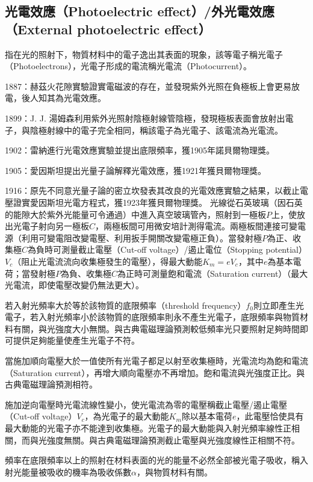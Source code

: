 \documentclass[a4paper,12pt]{article}
\begin{document}
\subsection{光電效應（Photoelectric effect）/外光電效應（External photoelectric effect）}
指在光的照射下，物質材料中的電子逸出其表面的現象，該等電子稱光電子（Photoelectrons），光電子形成的電流稱光電流（Photocurrent）。
\bit
\item 1887：赫茲火花隙實驗證實電磁波的存在，並發現紫外光照在負極板上會更易放電，後人知其為光電效應。
\item 1899：J. J. 湯姆森利用紫外光照射陰極射線管陰極，發現極板表面會放射出電子，與陰極射線中的電子完全相同，稱該電子為光電子、該電流為光電流。
\item 1902：雷納進行光電效應實驗並提出底限頻率，獲1905年諾貝爾物理獎。
\item 1905：愛因斯坦提出光量子論解釋光電效應，獲1921年獲貝爾物理獎。
\item 1916：原先不同意光量子論的密立坎發表其改良的光電效應實驗之結果，以截止電壓證實愛因斯坦光電方程式，獲1923年獲貝爾物理獎。
\eit
{}
光線從石英玻璃（因石英的能隙大於紫外光能量可令通過）中進入真空玻璃管內，照射到一極板$P$上，使放出光電子射向另一極板$C$，兩極板間可用微安培計測得電流。兩極板間連接可變電源（利用可變電阻改變電壓、利用扳手開關改變電極正負）。當發射極$P$為正、收集極$C$為負時可測量截止電壓（Cut-off voltage）/遏止電位（Stopping potential）$V_c$（阻止光電流流向收集極發生的電壓），得最大動能$K_m=eV_c$，其中$e$為基本電荷；當發射極$P$為負、收集極$C$為正時可測量飽和電流（Saturation current）（最大光電流，即使電壓改變仍無法更大）。
\bit
\item 若入射光頻率大於等於該物質的底限頻率（threshold frequency）$f_0$則立即產生光電子，若入射光頻率小於該物質的底限頻率則永不產生光電子，底限頻率與物質材料有關，與光強度大小無關。與古典電磁理論預測較低頻率光只要照射足夠時間即可提供足夠能量使產生光電子不符。
\item 當施加順向電壓大於一值使所有光電子都足以射至收集極時，光電流均為飽和電流（Saturation current），再增大順向電壓亦不再增加。飽和電流與光強度正比。與古典電磁理論預測相符。
\item 施加逆向電壓時光電流線性變小，使光電流為零的電壓稱截止電壓/遏止電壓（Cut-off voltage）$V_c$，為光電子的最大動能$K_m$除以基本電荷$e$，此電壓恰使具有最大動能的光電子亦不能達到收集極。光電子的最大動能與入射光頻率線性正相關，而與光強度無關。與古典電磁理論預測截止電壓與光強度線性正相關不符。
\item 頻率在底限頻率以上的照射在材料表面的光的能量不必然全部被光電子吸收，稱入射光能量被吸收的機率為吸收係數$\alpha$，與物質材料有關。
\end{document}
